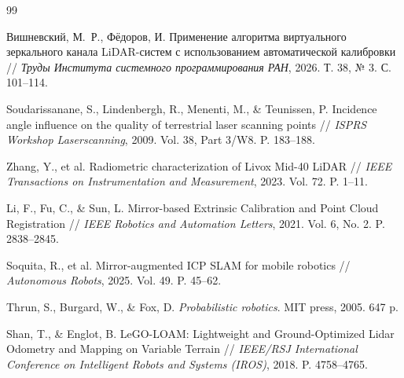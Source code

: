 \documentclass{misisarticle}
\begin{document}
\begin{thebibliography}{99}

Вишневский, М.~Р., Фёдоров, И. Применение алгоритма виртуального зеркального канала LiDAR-систем с использованием автоматической калибровки // \textit{Труды Института системного программирования РАН}, 2026. Т. 38, № 3. С. 101--114.

Soudarissanane, S., Lindenbergh, R., Menenti, M., \& Teunissen, P. Incidence angle influence on the quality of terrestrial laser scanning points // \textit{ISPRS Workshop Laserscanning}, 2009. Vol. 38, Part 3/W8. P. 183--188.

Zhang, Y., et al. Radiometric characterization of Livox Mid-40 LiDAR // \textit{IEEE Transactions on Instrumentation and Measurement}, 2023. Vol. 72. P. 1--11.

Li, F., Fu, C., \& Sun, L. Mirror-based Extrinsic Calibration and Point Cloud Registration // \textit{IEEE Robotics and Automation Letters}, 2021. Vol. 6, No. 2. P. 2838--2845.

Soquita, R., et al. Mirror-augmented ICP SLAM for mobile robotics // \textit{Autonomous Robots}, 2025. Vol. 49. P. 45--62.

Thrun, S., Burgard, W., \& Fox, D. \textit{Probabilistic robotics}. MIT press, 2005. 647 p.

Shan, T., \& Englot, B. LeGO-LOAM: Lightweight and Ground-Optimized Lidar Odometry and Mapping on Variable Terrain // \textit{IEEE/RSJ International Conference on Intelligent Robots and Systems (IROS)}, 2018. P. 4758--4765.

\end{thebibliography}
\end{document}
